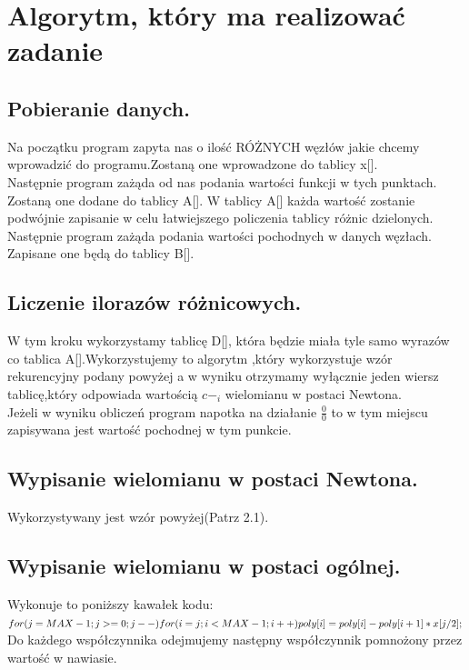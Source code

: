 \documentclass[16pt]{article} %
\begin{document}
\section{Algorytm, który ma realizować zadanie}
\subsection{Pobieranie danych.}
Na początku program zapyta nas o ilość RÓŻNYCH węzłów jakie chcemy wprowadzić do programu.Zostaną one wprowadzone do tablicy x[].\\
Następnie program zażąda od nas podania wartości funkcji w tych punktach. Zostaną one dodane do tablicy A[]. W tablicy A[] każda wartość zostanie podwójnie zapisanie w celu łatwiejszego 
policzenia tablicy różnic dzielonych.\\Następnie program zażąda podania wartości pochodnych w danych węzłach. Zapisane one będą do tablicy B[].\\
\subsection{Liczenie ilorazów różnicowych.}
W tym kroku wykorzystamy tablicę D[], która będzie miała tyle samo wyrazów co tablica A[].Wykorzystujemy to algorytm ,który wykorzystuje wzór rekurencyjny podany powyżej
a w wyniku otrzymamy wyłącznie jeden wiersz tablicę,który odpowiada wartością $c-_i$ wielomianu w postaci Newtona.\\
Jeżeli w wyniku obliczeń program napotka na działanie $\frac{0}{0}$ to w tym miejscu zapisywana jest wartość pochodnej w tym punkcie.

\subsection{Wypisanie wielomianu w postaci Newtona.}
Wykorzystywany jest wzór powyżej(Patrz 2.1).
\subsection{Wypisanie wielomianu w postaci ogólnej.}
Wykonuje to poniższy kawałek kodu: \\
$for (j = MAX - 1; j >= 0; j--)\\
	for (i = j; i <MAX- 1; i++)\\
	    poly[i] = poly[i] - poly[i + 1] * x[j / 2];\\$
	    Do każdego współczynnika odejmujemy następny współczynnik pomnożony przez wartość w nawiasie.	    
\end{document}
